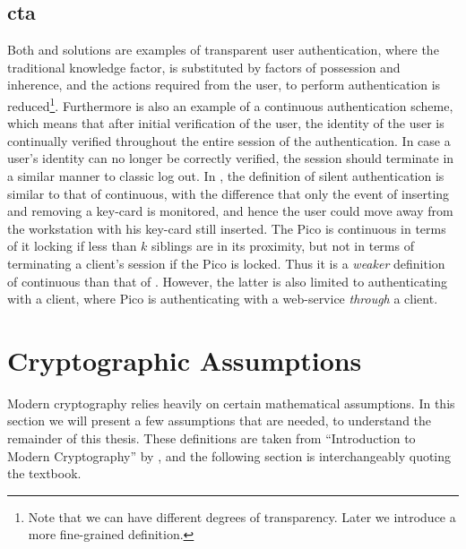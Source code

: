 \subsection{\acrlong{cta}}
Both \citet{bardram2003context} and \citet{ojala2008wearable} solutions are examples of transparent user authentication, where the traditional knowledge factor, is substituted by factors of possession and inherence, and the actions required from the user, to perform authentication is reduced\footnote{Note that we can have different degrees of transparency. Later we introduce a more fine-grained definition.}.
Furthermore \cite{ojala2008wearable} is also an example of a continuous authentication scheme, which means that after initial verification of the user, the identity of the user is continually verified throughout the entire session of the authentication.
In case a user's identity can no longer be correctly verified, the session should terminate in a similar manner to classic log out. In \cite{bardram2003context}, the definition of silent authentication is similar to that of continuous, with the difference that only the event of inserting and removing a key-card is monitored, and hence the user could move away from the workstation with his key-card still inserted.
The Pico \cite{stajano2011pico} is continuous in terms of it locking if less than $k$ siblings are in its proximity, but not in terms of terminating a client's session if the Pico is locked.
Thus it is a \textit{weaker} definition of continuous than that of  \cite{ojala2008wearable}.
However, the latter is also limited to authenticating with a client, where Pico is authenticating with a web-service \textit{through} a client.



\begin{comment}
In this section we will outline certain
\cite{boyd1986digital}
\cite{rabin1998simplified}
\cite{boneh2001method}
\cite{boneh2002identity}
\end{comment}

\section{Cryptographic Assumptions}
Modern cryptography relies heavily on certain mathematical assumptions. In this section we will present a few assumptions that are needed, to understand the remainder of this thesis. These definitions are taken from ``Introduction to Modern Cryptography'' by \citet{katz2014introduction}, and the following section is interchangeably quoting the textbook.

